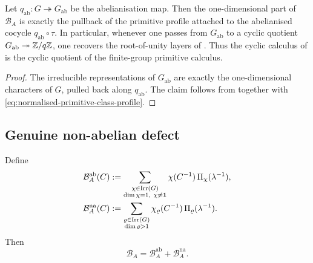 \begin{corollary}
  \label{cor:abelian-cyclic-shadow}
  Let \(q_{\mathrm{ab}}:G\twoheadrightarrow G_{\mathrm{ab}}\) be the
  abelianisation map. Then the one-dimensional part of
  \(\mathcal B_A\) is exactly the pullback of the primitive profile
  attached to the abelianised cocycle \(q_{\mathrm{ab}}\circ\tau\). In
  particular, whenever one passes from \(G_{\mathrm{ab}}\) to a cyclic
  quotient \(G_{\mathrm{ab}}\twoheadrightarrow \mathbb{Z}/q\mathbb{Z}\), one recovers
  the root-of-unity layers of . Thus the cyclic
  calculus of  is the cyclic quotient of the
  finite-group primitive calculus.
\end{corollary}

\begin{proof}
  The irreducible representations of \(G_{\mathrm{ab}}\) are exactly
  the one-dimensional characters of \(G\), pulled back along
  \(q_{\mathrm{ab}}\). The claim follows from
   together with
  \eqref{eq:normalised-primitive-class-profile}.
\end{proof}

\subsection{Genuine non-abelian defect}

Define
\begin{equation}\label{eq:abelian-shadow-defect}
  \begin{aligned}
    \mathcal B_A^{\mathrm{ab}}(C)
    &:=
    \sum_{\substack{\chi\in\operatorname{Irr}(G)\\ \dim\chi=1,\ \chi\neq \mathbf 1}}
      \chi(C^{-1})\,\Pi_\chi(\lambda^{-1}), \\
    \mathcal B_A^{\mathrm{na}}(C)
    &:=
    \sum_{\substack{\varrho\in\operatorname{Irr}(G)\\ \dim\varrho>1}}
      \chi_\varrho(C^{-1})\,\Pi_\varrho(\lambda^{-1}).
  \end{aligned}
\end{equation}
Then
\begin{equation}\label{eq:abelian-shadow-defect-sum}
  \mathcal B_A=\mathcal B_A^{\mathrm{ab}}+\mathcal B_A^{\mathrm{na}}.
\end{equation}

